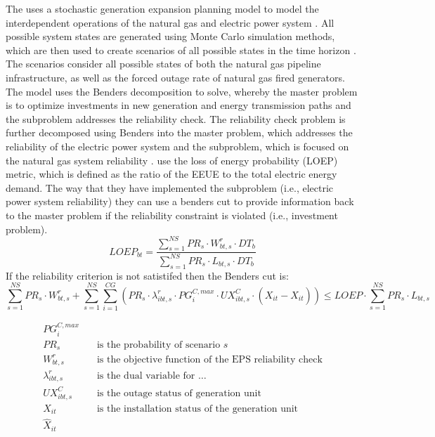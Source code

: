 \documentclass[10pt]{amsart}
\begin{document}
The uses a stochastic generation expansion planning model to model the interdependent operations of the natural gas and electric power system \parencite{pantos:2013aa}.
All possible system states are generated using Monte Carlo simulation methods, which are then used to create scenarios of all possible states in the time horizon \parencite{pantos:2013aa}. 
The scenarios consider all possible states of both the natural gas pipeline infrastructure, as well as the forced outage rate of natural gas fired generators. 
The model uses the Benders decomposition to solve, whereby the master problem is to optimize investments in new generation and energy transmission paths and the subproblem addresses the reliability check.
The reliability check problem is further decomposed using Benders into  the master problem, which addresses the reliability of the electric power system and the subproblem, which is focused on the natural gas system reliability \parencite{pantos:2013aa}. 
\cite{pantos:2013aa} use the loss of energy probability (LOEP) metric, which is defined as the ratio of the EEUE to the total electric energy demand. 
The way that they have implemented the subproblem (i.e., electric power system reliability) they can use a benders cut to provide information back to the master problem if the reliability constraint is violated (i.e., investment problem). 
\begin{equation}
LOEP_{bt} = \frac{\sum_{s=1}^{NS} PR_{s}\cdot W^{r}_{bt, s}\cdot DT_{b}}{\sum_{s=1}^{NS} PR_{s}\cdot L_{bt, s}\cdot DT_{b}}
\end{equation}
If the reliability criterion is not satistifed then the Benders cut is:
\begin{equation}
\sum_{s=1}^{NS} PR_{s}\cdot W^{r}_{bt,s} + \sum_{s=1}^{NS}\sum_{i=1}^{CG}(PR_{s}\cdot\lambda^{r}_{ibt,s}\cdot PG^{C,max}_{i}\cdot UX^{C}_{ibt,s}\cdot (X_{it}-\hat{X}_{it}))\leq LOEP\cdot \sum_{s=1}^{NS}PR_{s}\cdot L_{bt,s}
\end{equation}

\begin{equation}
\begin{split}
PG_{i}^{C,max} &\quad \text{} \\
PR_{s} &\quad \text{is the probability of scenario $s$} \\
W^{r}_{bt,s} &\quad \text{is the objective function of the EPS reliability check}\\
\lambda^{r}_{ibt,s} &\quad \text{is the dual variable for $\ldots$}\\
UX^{C}_{ibt,s} &\quad \text{is the outage status of generation unit}\\
X_{it} &\quad \text{is the installation status of the generation unit}\\
\hat{X}_{it} &\quad \text{}\\
\end{split}
\end{equation}
\end{document}
